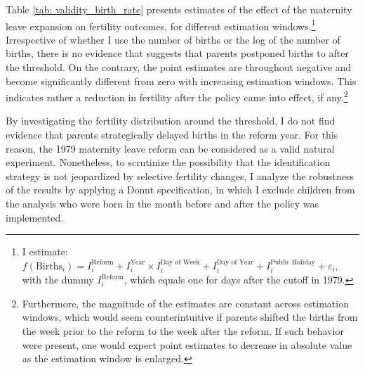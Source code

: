 \documentclass[11pt, a4paper,draft]{article} %
\begin{document}
Table \ref{tab: validity_birth_rate} presents estimates of the effect of the maternity leave expansion on fertility outcomes, for different estimation windows.\footnote{I estimate: $f(\text{Births}_i) = I^{\text{Reform}}_i + I^{\text{Year}}_i\times I^{\text{Day of Week}}_i + I^{\text{Day of Year}}_i + I^{\text{Public Holiday}}_i + \varepsilon_i$, with the dummy $I^{\text{Reform}}_i$, which equals one for days after the cutoff in 1979.} Irrespective of whether I use the number of births or the log of the number of births, there is no evidence that suggests that parents postponed births to after the threshold. On the contrary, the point estimates are throughout negative and become significantly different from zero with increasing estimation windows. This indicates rather a reduction in fertility after the policy came into effect, if any.\footnote{Furthermore, the magnitude of the estimates are constant across estimation windows, which would seem counterintuitive if parents shifted the births from the week prior to the reform to the week after the reform. If such behavior were present, one would expect point estimates to decrease in absolute value as the estimation window is enlarged.} \newline 

By investigating the fertility distribution around the threshold, I do not find evidence that parents strategically delayed births in the reform year. For this reason, the 1979 maternity leave reform can be considered as a valid natural experiment. Nonetheless, to scrutinize the possibility that the identification strategy is not jeopardized by selective fertility changes, I analyze the robustness of the results by applying a Donut specification, in which I exclude children from the analysis who were born in the month before and after the policy was implemented.




	
\end{document}

